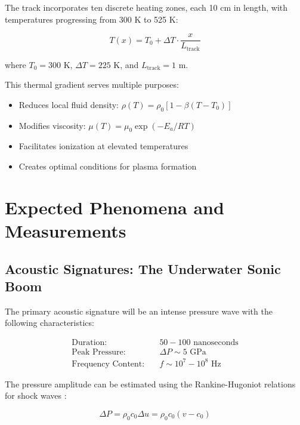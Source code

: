 \documentclass[12pt,a4paper]{article}
\begin{document}
The track incorporates ten discrete heating zones, each 10 cm in length, with temperatures progressing from 300 K to 525 K:

\begin{equation}
T(x) = T_0 + \Delta T \cdot \frac{x}{L_{\text{track}}}
\label{eq:temperature_profile}
\end{equation}

where $T_0 = 300$ K, $\Delta T = 225$ K, and $L_{\text{track}} = 1$ m.

This thermal gradient serves multiple purposes:
\begin{itemize}
\item Reduces local fluid density: $\rho(T) = \rho_0[1 - \beta(T - T_0)]$ \cite{cengel2019thermodynamics}
\item Modifies viscosity: $\mu(T) = \mu_0 \exp(-E_a/RT)$ \cite{bird2006transport}
\item Facilitates ionization at elevated temperatures
\item Creates optimal conditions for plasma formation
\end{itemize}

\section{Expected Phenomena and Measurements}

\subsection{Acoustic Signatures: The Underwater Sonic Boom}

The primary acoustic signature will be an intense pressure wave with the following characteristics:

\begin{align}
\text{Duration:} &\quad 50-100 \text{ nanoseconds} \\
\text{Peak Pressure:} &\quad \Delta P \sim 5 \text{ GPa} \\
\text{Frequency Content:} &\quad f \sim 10^{7}-10^{8} \text{ Hz}
\end{align}

The pressure amplitude can be estimated using the Rankine-Hugoniot relations for shock waves \cite{zel1967physics}:

\begin{equation}
\Delta P = \rho_0 c_0 \Delta u = \rho_0 c_0 (v - c_0)
\label{eq:shock_pressure}
\end{equation}
\end{document}
